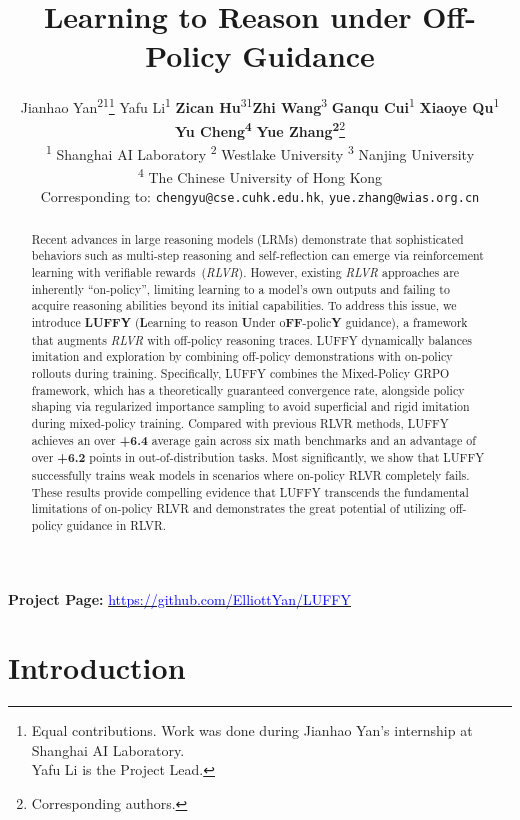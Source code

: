 \documentclass{article}
\title{Learning to Reason under Off-Policy Guidance}
\author{
    Jianhao Yan\textsuperscript{2}\textsuperscript{1}\thanks{\quad Equal contributions. Work was done during Jianhao Yan's internship at Shanghai AI Laboratory. \\ \quad Yafu Li is the Project Lead.} \quad Yafu Li\textsuperscript{1}\footnotemark[1]\quad
    \textbf{Zican Hu}\textsuperscript{3}\textsuperscript{1}\quad \textbf{Zhi Wang}\textsuperscript{3} \quad
    \textbf{Ganqu Cui}\textsuperscript{1} \quad  \textbf{Xiaoye Qu}\textsuperscript{1} \quad  \\
    \textbf{Yu Cheng}\textsuperscript{\textbf{4}} \hspace{-1mm}\footnotemark[2] \quad \textbf{Yue Zhang}\textsuperscript{\textbf{2}}\thanks{\quad Corresponding authors.}\\
    \textsuperscript{1} Shanghai AI Laboratory 
    \textsuperscript{2} Westlake University 
    \textsuperscript{3} Nanjing University \\
    \textsuperscript{4} The Chinese University of Hong Kong \\
   Corresponding to: \texttt{chengyu@cse.cuhk.edu.hk}, \texttt{yue.zhang@wias.org.cn}
}
\begin{document}
\maketitle


\begin{center}
\vspace{-26pt}
  \textbf{Project Page:} \href{https://github.com/ElliottYan/LUFFY}{\textcolor{blue}{https://github.com/ElliottYan/LUFFY}}
\end{center}

\begin{abstract}




Recent advances in large reasoning models (LRMs) demonstrate that sophisticated behaviors such as multi-step reasoning and self-reflection can emerge via reinforcement learning with verifiable rewards~(\textit{RLVR}). 
However, existing \textit{RLVR} approaches are inherently ``on-policy'', limiting learning to a model's own outputs and failing to acquire reasoning abilities beyond its initial capabilities. 
To address this issue, we introduce \textbf{LUFFY} (\textbf{L}earning to reason \textbf{U}nder o\textbf{FF}-polic\textbf{Y} guidance), a framework that augments \textit{RLVR} with off-policy reasoning traces. 
LUFFY dynamically balances imitation and exploration by combining off-policy demonstrations with on-policy rollouts during training. 
Specifically, LUFFY combines the Mixed-Policy GRPO framework, which has a theoretically guaranteed convergence rate, alongside policy shaping via regularized importance sampling to avoid superficial and rigid imitation during mixed-policy training. 
Compared with previous RLVR methods, LUFFY achieves an over \textbf{+6.4} average gain across six math benchmarks and an advantage of over \textbf{+6.2} points in out-of-distribution tasks.
Most significantly, we show that LUFFY successfully trains weak models in scenarios where on-policy RLVR completely fails. These results provide compelling evidence that LUFFY transcends the fundamental limitations of on-policy RLVR and demonstrates the great potential of utilizing off-policy guidance in RLVR.
\end{abstract}




\section{Introduction}
\end{document}
